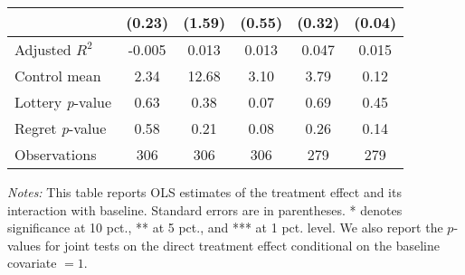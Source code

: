 \begin{table}[htbp]
{\begin{threeparttable}
\begin{tabular}{l*{5}{c}}
                &   (0.23)         &   (1.59)         &   (0.55)         &   (0.32)         &   (0.04)         \\
\midrule
Adjusted \(R^{2}\)&   -0.005         &    0.013         &    0.013         &    0.047         &    0.015         \\
Control mean    &     2.34         &    12.68         &     3.10         &     3.79         &     0.12         \\
Lottery \emph{p}-value&     0.63         &     0.38         &     0.07         &     0.69         &     0.45         \\
Regret \emph{p}-value&     0.58         &     0.21         &     0.08         &     0.26         &     0.14         \\
Observations    &      306         &      306         &      306         &      279         &      279         \\
\bottomrule \end{tabular} \begin{tablenotes}[flushleft] \footnotesize \item \emph{Notes:} This table reports OLS estimates of the treatment effect and its interaction with baseline. Standard errors are in parentheses. * denotes significance at 10 pct., ** at 5 pct., and *** at 1 pct. level. We also report the \(p\)-values for joint tests on the direct treatment effect conditional on the baseline covariate $= 1$. \end{tablenotes} \end{threeparttable} } \end{table}
